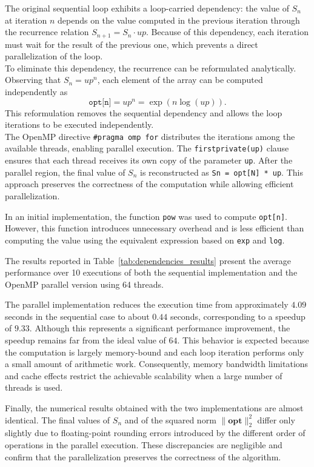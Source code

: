 \documentclass[unicode,10pt,a4paper,oneside,numbers=endperiod,openany]{scrartcl}
\begin{document}
The original sequential loop exhibits a loop-carried dependency: the value of $S_n$ at iteration $n$ depends on the value computed in the previous iteration through the recurrence relation $S_{n+1}=S_n \cdot up$. Because of this dependency, each iteration must wait for the result of the previous one, which prevents a direct parallelization of the loop.\\
To eliminate this dependency, the recurrence can be reformulated analytically. Observing that $S_n = up^n$, each element of the array can be computed independently as
\[
\texttt{opt[n]} = up^n = \exp(n \log(up)).
\]
This reformulation removes the sequential dependency and allows the loop iterations to be executed independently.\\

The OpenMP directive \texttt{\#pragma omp for} distributes the iterations among the available threads, enabling parallel execution. The \texttt{firstprivate(up)} clause ensures that each thread receives its own copy of the parameter \texttt{up}. After the parallel region, the final value of $S_n$ is reconstructed as \texttt{Sn = opt[N] * up}. This approach preserves the correctness of the computation while allowing efficient parallelization.

In an initial implementation, the function \texttt{pow} was used to compute \texttt{opt[n]}. However, this function introduces unnecessary overhead and is less efficient than computing the value using the equivalent expression based on \texttt{exp} and \texttt{log}.

The results reported in Table~\ref{tab:dependencies_results} present the average performance over 10 executions of both the sequential implementation and the OpenMP parallel version using 64 threads.

The parallel implementation reduces the execution time from approximately $4.09$ seconds in the sequential case to about $0.44$ seconds, corresponding to a speedup of $9.33$. Although this represents a significant performance improvement, the speedup remains far from the ideal value of $64$. This behavior is expected because the computation is largely memory-bound and each loop iteration performs only a small amount of arithmetic work. Consequently, memory bandwidth limitations and cache effects restrict the achievable scalability when a large number of threads is used.

Finally, the numerical results obtained with the two implementations are almost identical. The final values of $S_n$ and of the squared norm $\|\mathbf{opt}\|_2^2$ differ only slightly due to floating-point rounding errors introduced by the different order of operations in the parallel execution. These discrepancies are negligible and confirm that the parallelization preserves the correctness of the algorithm.
\end{document}
